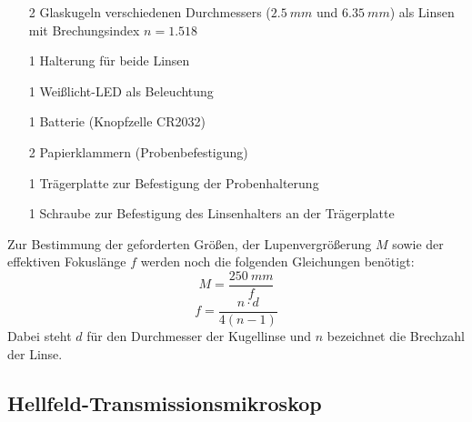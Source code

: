 \documentclass[ngerman]{scrartcl}
\begin{document}
%
\begin{itemize}
    \item[2] Glaskugeln verschiedenen Durchmessers ($\SI{2,5}{mm}$ und $\SI{6,35}{mm}$) als Linsen mit Brechungsindex $n = \num{1,518}$
    \item[1] Halterung für beide Linsen
    \item[1] Weißlicht-LED als Beleuchtung
    \item[1] Batterie (Knopfzelle CR2032)
    \item[2] Papierklammern (Probenbefestigung)
    \item[1] Trägerplatte zur Befestigung der Probenhalterung
    \item[1] Schraube zur Befestigung des Linsenhalters an der Trägerplatte
\end{itemize}
%
Zur Bestimmung der geforderten Größen, der Lupenvergrößerung $M$ sowie der effektiven Fokuslänge $f$ werden noch die folgenden Gleichungen benötigt:
%
\begin{equation}
    \label{eq:vergroesserung_leeuwenhoek}
    M = \frac{\SI{250}{mm}}{f}
\end{equation}
%
\begin{equation}
    \label{eq:fokuslaenge_leeuwenhoek}
    f = \frac{n \cdot d}{4(n-1)}
\end{equation}
%
Dabei steht $d$ für den Durchmesser der Kugellinse und $n$ bezeichnet die Brechzahl der Linse.


\subsection{Hellfeld-Transmissionsmikroskop}
\label{subsec:hellfeld_transmissionsmikroskop_grundlagen}
\end{document}
